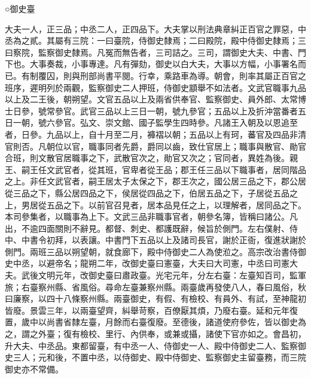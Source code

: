 
\begin{pinyinscope}

 ○御史臺



 大夫一人，正三品；中丞二人，正四品下。大夫掌以刑法典章糾正百官之罪惡，中丞為之貳。其屬有三院：一曰臺院，侍御史隸焉；二曰殿院，殿中侍御史隸焉；三曰察院，監察御史隸焉。凡冤而無告者，三司詰之。三司，謂御史大夫、中書、門下也。大事奏裁，小事專達。凡有彈劾，御史以白大夫，大事以方幅，小事署名而已。有制覆囚，則與刑部尚書平閱。行幸，乘路車為導。朝會，則率其屬正百官之班序，遲明列於兩觀，監察御史二人押班，侍御史顓舉不如法者。文武官職事九品以上及二王後，朝朔望。文官五品以上及兩省供奉官、監察御史、員外郎、太常博士日參，號常參官。武官三品以上三日一朝，號九參官；五品以上及折沖當番者五日一朝，號六參官。弘文、崇文館、國子監學生四時參。凡諸王入朝及以恩追至者，日參。九品以上，自十月至二月，褲褶以朝；五品以上有珂，蕃官及四品非清官則否。凡朝位以官，職事同者先爵，爵同以齒，致仕官居上；職事與散官、勛官合班，則文散官居職事之下，武散官次之，勛官又次之；官同者，異姓為後。親王、嗣王任文武官者，從其班，官卑者從王品；郡王任三品以下職事者，居同階品之上。非任文武官者，嗣王居太子太保之下，郡王次之，國公居三品之下，郡公居從三品之下，縣公居四品之下，侯居從四品之下，伯居五品之下，子居從五品之上，男居從五品之下。以前官召見者，居本品見任之上，以理解者，居同品之下。本司參集者，以職事為上下。文武三品非職事官者，朝參名簿，皆稱曰諸公。凡出，不逾四面關則不辭見。都督、刺史、都護既辭，候旨於側門。左右僕射、侍中、中書令初拜，以表讓。中書門下五品以上及諸司長官，謝於正衙，復進狀謝於側門。兩班三品以朔望朝，就食廊下，殿中侍御史二人為使涖之。高宗改治書侍御史中丞，以避帝名；龍朔二年，改御史臺曰憲臺，大夫曰大司憲，中丞曰司憲大夫。武後文明元年，改御史臺曰肅政臺。光宅元年，分左右臺：左臺知百司，監軍旅；右臺察州縣、省風俗。尋命左臺兼察州縣。兩臺歲再發使八人，春曰風俗，秋曰廉察，以四十八條察州縣。兩臺御史，有假、有檢校、有員外、有試，至神龍初皆廢。景雲三年，以兩臺望齊，糾舉苛察，百僚厭其煩，乃廢右臺。延和元年復置，歲中以尚書省隸左臺，月餘而右臺復廢。至德後，諸道使府參佐，皆以御史為之，謂之外臺；復有檢校、里行、內供奉，或兼或攝，諸使下官亦如之。會昌初，升大夫、中丞品。東都留臺，有中丞一人、侍御史一人、殿中侍御史二人、監察御史三人；元和後，不置中丞，以侍御史、殿中侍御史、監察御史主留臺務，而三院御史亦不常備。




\end{pinyinscope}
